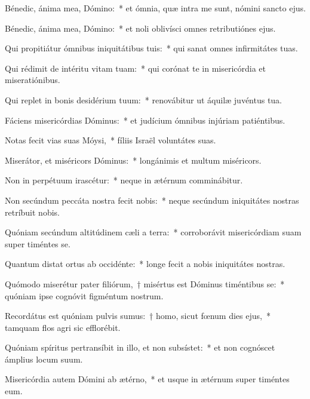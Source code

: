 \item Bénedic, ánima mea, Dómino:~* et ómnia, quæ intra me sunt, nómini sancto ejus.

\item Bénedic, ánima mea, Dómino:~* et noli oblivísci omnes retributiónes ejus.

\item Qui propitiátur ómnibus iniquitátibus tuis:~* qui sanat omnes infirmitátes tuas.

\item Qui rédimit de intéritu vitam tuam:~* qui corónat te in misericórdia et miseratiónibus.

\item Qui replet in bonis desidérium tuum:~* renovábitur ut áquilæ juvéntus tua.

\item Fáciens misericórdias Dóminus:~* et judícium ómnibus injúriam patiéntibus.

\item Notas fecit vias suas Móysi,~* fíliis Israël voluntátes suas.

\item Miserátor, et miséricors Dóminus:~* longánimis et multum miséricors.

\item Non in perpétuum irascétur:~* neque in ætérnum comminábitur.

\item Non secúndum peccáta nostra fecit nobis:~* neque secúndum iniquitátes nostras retríbuit nobis.

\item Quóniam secúndum altitúdinem cæli a terra:~* corroborávit misericórdiam suam super timéntes se.

\item Quantum distat ortus ab occidénte:~* longe fecit a nobis iniquitátes nostras.

\item Quómodo miserétur pater filiórum,~† misértus est Dóminus timéntibus se:~* quóniam ipse cognóvit figméntum nostrum.

\item Recordátus est quóniam pulvis sumus:~† homo, sicut fœnum dies ejus,~* tamquam flos agri sic efflorébit.

\item Quóniam spíritus pertransíbit in illo, et non subsístet:~* et non cognóscet ámplius locum suum.

\item Misericórdia autem Dómini ab ætérno,~* et usque in ætérnum super timéntes eum.

